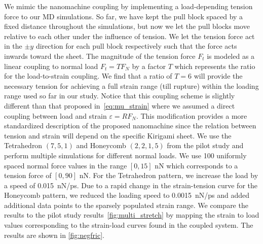 We mimic the nanomachine coupling by implementing a load-depending tension force to our \acrshort{MD} simulations. So far, we have kept the pull block spaced by a fixed distance throughout the simulations, but now we let the pull blocks move relative to each other under the influence of tension. We let the tension force act in the $\pm y$ direction for each pull block respectively such that the force acts inwards toward the sheet. The magnitude of the tension force $F_t$ is modeled as a linear coupling to normal load $F_t = TF_N$ by a factor $T$ which represents the ratio for the load-to-strain coupling. We find that a ratio of
$T=6$ will provide the necessary tension for achieving a full strain range (till rupture) within the loading range used so far in our study. Notice that this coupling scheme is slightly different than that proposed in~\cref{eq:mu_strain} where we assumed a direct coupling between load and strain $\varepsilon = R F_N$. This modification provides a more standardized description of the proposed nanomachine since the relation between tension and strain will depend on the specific Kirigami sheet. We use the Tetrahedron
$(7,5,1)$ and Honeycomb $(2,2,1,5)$ from the pilot study and perform multiple
simulations for different normal loads. We use 100 uniformly spaced normal force
values in the range $[0, 15]$ nN which corresponds to a tension force of $[0, 90]$ nN. For the Tetrahedron pattern, we increase the load by a speed of \SI{0.015}{nN/ps}. Due to a rapid change in the strain-tension curve for the Honeycomb pattern, we reduced the loading speed to \SI{0.0015}{nN/ps} and added additional data points to the sparsely populated strain range. We compare the results to the pilot study results~\cref{fig:multi_stretch} by mapping the strain to load values corresponding to the strain-load curves found in the coupled system. The results are shown in \cref{fig:negfric}.


